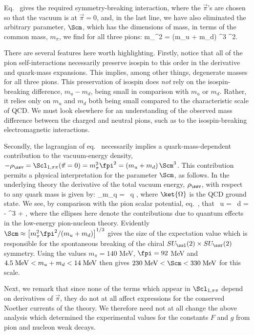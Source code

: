 Eq.~ gives the required 
symmetry-breaking interaction, where
the $\vec\pi$'s are chosen so that the vacuum is
at $\vec \pi = 0$, and, in the last line, we have
also eliminated the arbitrary parameter, $\Scm$, which has
the dimensions of mass, in terms of the common mass,
$m_\pi$, we find for all three pions:
%
\eq
\label{pionmassprediction}
 m_\pi^2 =  (m_u + m_d) \; {\Scm^3 \over \fpi^2}.  
\eeq

There are several features here worth highlighting.
Firstly, notice that all of the pion self-interactions
necessarily preserve isospin to this order in the
derivative and quark-mass expansions. This implies, among
other things, degenerate masses for all three pions. This
preservation of isospin does {\em not} rely on the
isospin-breaking difference, $m_u - m_d$, being small in
comparison with $m_u$ or $m_d$. Rather, it relies only
on $m_u$ and $m_d$ both being small compared to the
characteristic scale of QCD. We must look elsewhere for
an understanding of the observed mass difference between
the charged and neutral pions, such as to the
isospin-breaking electromagnetic interactions.

Secondly, the lagrangian of eq.~
necessarily implies a quark-mass-dependent contribution to
the vacuum-energy density, $- \rho_\ssv
= \Scl_{1,\pi\pi}( \vec\pi =
0) = m_\pi^2 \fpi^2 = (m_u + m_d) \, \Scm^3$. This
contribution permits a physical interpretation for the
parameter $\Scm$, as follows. In the underlying theory the
derivative of the total vacuum energy, 
$\rho_\ssv$, with respect to any quark mass is given by:  
%
\eq
\label{qqbarvev}
{\partial \rho_\ssv \over \partial m_q} =
\bra{\Omega} \qbr \, q \ket{\Omega},
\eeq
%
where $\ket{\Omega}$ is the QCD ground state. We see, by
comparison with the pion scalar potential, 
eq.~, that  
%
\eq
\label{qqbarvevval}
\bra{\Omega} \ubr \, u \ket{\Omega} = 
\bra{\Omega} \dbr \, d  \ket{\Omega} =
- \Scm^3 + \cdots,
\eeq
%
where the ellipses here denote the contributions due to
quantum effects in the low-energy pion-nucleon theory.
Evidently $\Scm \approx \left[m_\pi^2 \fpi^2/(m_u+m_d)
\right]^{1/3}$ gives the size of the expectation value
which is responsible for the spontaneous breaking of the
chiral $SU_\ssl(2) \times SU_\ssr(2)$ symmetry. Using
the values $m_\pi = 140$ MeV, $\fpi = 92$ MeV and
$4.5 \; \hbox{MeV} < m_u + m_d < 14 \; \hbox{MeV}$
then gives $230 \; \hbox{MeV} < \Scm < 330 
\; \hbox{MeV}$ for this scale.

Next, we remark that since none of the terms which appear
in $\Scl_{1,\pi\pi}$ depend on derivatives of $\vec\pi$, they
do not at all affect expressions  for the
conserved Noether currents of the theory. We therefore need
not at all change the above analysis which determined the
experimental values for the constants $F$ and $g$ from pion
and nucleon weak decays.

